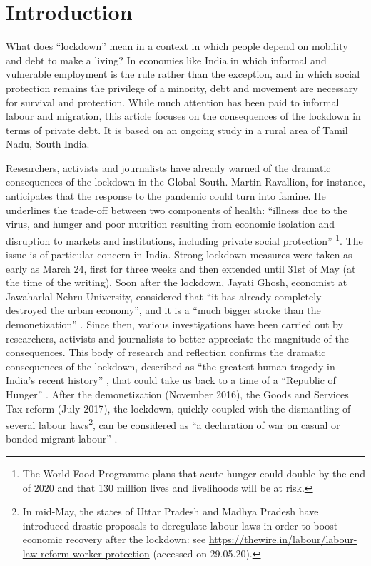 \documentclass[a4paper, 11pt, onecolumn]{article}
\begin{document}
\section*{Introduction}
\label{section:introduction}
What does ``lockdown'' mean in a context in which people depend on mobility and debt to make a living? In economies like India in which informal and vulnerable employment is the rule rather than the exception, and in which social protection remains the privilege of a minority, debt and movement are necessary for survival and protection. 
While much attention has been paid to informal labour and migration, this article focuses on the consequences of the lockdown in terms of private debt. 
It is based on an ongoing study in a rural area of Tamil Nadu, South India.

Researchers, activists and journalists have already warned of the dramatic consequences of the lockdown in the Global South. 
Martin Ravallion, for instance, anticipates that the response to the pandemic could turn into famine. 
He underlines the trade-off between two components of health: “illness due to the virus, and hunger and poor nutrition resulting from economic isolation and disruption to markets and institutions, including private social protection” \citep{Ravallion2020}\footnote{The World Food Programme plans that acute hunger could double by the end of 2020 and that 130 million lives and livelihoods will be at risk.}. 
The issue is of particular concern in India.
Strong lockdown measures were taken as early as March 24, first for three weeks and then extended until 31st of May (at the time of the writing). 
Soon after the lockdown, Jayati Ghosh, economist at Jawaharlal Nehru University, considered that “it has already completely destroyed the urban economy”, and it is a “much bigger stroke than the demonetization” \citep{Thapar2020}. 
Since then, various investigations have been carried out by researchers, activists and journalists to better appreciate the magnitude of the consequences.
This body of research and reflection confirms the dramatic consequences of the lockdown, described as ``the greatest human tragedy in India's recent history'' \citep{Bhagat2020}, that could take us back to a time of a ``Republic of Hunger'' \citep{Deshpande2020}. 
After the demonetization (November 2016), the Goods and Services Tax reform (July 2017), the lockdown, quickly coupled with the dismantling of several labour laws\footnote{In mid-May, the states of Uttar Pradesh and Madhya Pradesh have introduced drastic proposals to deregulate labour laws in order to boost economic recovery after the lockdown: see \url{https://thewire.in/labour/labour-law-reform-worker-protection} (accessed on 29.05.20).}, can be considered as ``a declaration of war on casual or bonded migrant labour'' \citep{Harriss-White2020}.
\end{document}
